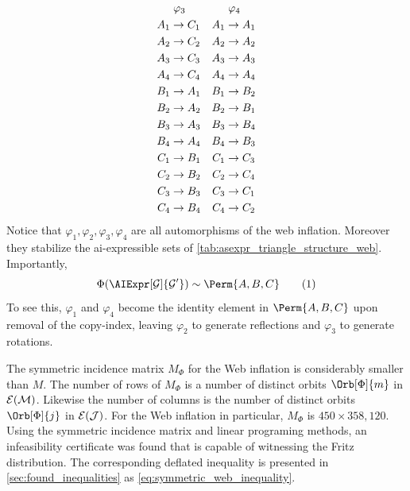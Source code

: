 \documentclass[aps, 10pt, english, twoside, pra, nofootinbib, tightenlines, longbibliography, superscriptaddress]{revtex4-1}
\begin{document}
\begin{equation}
\begin{aligned}[c]
    &\hspace{1mm}\varphi_3 \\
    A_1 &\to C_1 \\A_2 &\to C_2 \\A_3 &\to C_3 \\A_4 &\to C_4 \\B_1 &\to A_1 \\B_2 &\to A_2 \\B_3 &\to A_3 \\B_4 &\to A_4 \\C_1 &\to B_1 \\C_2 &\to B_2 \\C_3 &\to B_3 \\C_4 &\to B_4
    \end{aligned}
    \quad
    \begin{aligned}[c]
    &\hspace{1mm}\varphi_4 \\
    A_1 &\to A_1 \\A_2 &\to A_2 \\A_3 &\to A_3 \\A_4 &\to A_4 \\B_1 &\to B_2 \\B_2 &\to B_1 \\B_3 &\to B_4 \\B_4 &\to B_3 \\C_1 &\to C_3 \\C_2 &\to C_4 \\C_3 &\to C_1 \\C_4 &\to C_2
    \end{aligned}
    \end{equation}
    Notice that $\varphi_1, \varphi_2, \varphi_3, \varphi_4$ are all automorphisms of the web inflation. Moreover they stabilize the ai-expressible sets of \cref{tab:asexpr_triangle_structure_web}. Importantly,
    \[ \gp\br{\AIExpr[\graph]{\graph'}} \sim \Perm{A,B,C} \eq \]
    To see this, $\varphi_1$ and $\varphi_4$ become the identity element in $\Perm{A,B,C}$ upon removal of the copy-index, leaving $\varphi_2$ to generate reflections and $\varphi_3$ to generate rotations.

    The symmetric incidence matrix $M_{\Phi}$ for the Web inflation is considerably smaller than $M$. The number of rows of $M_{\Phi}$ is a number of distinct orbits $\Orb[\Phi]{m}$ in $\Events{\mscenario}$. Likewise the number of columns is the number of distinct orbits $\Orb[\Phi]{j}$ in $\Events{\jointvar}$. For the Web inflation in particular, $M_{\Phi}$ is $450 \times 358,120$. Using the symmetric incidence matrix and linear programing methods, an infeasibility certificate was found that is capable of witnessing the Fritz distribution. The corresponding deflated inequality is presented in \cref{sec:found_inequalities} as \cref{eq:symmetric_web_inequality}.

    \nocite{apsrev41Control}
    
\end{document}
